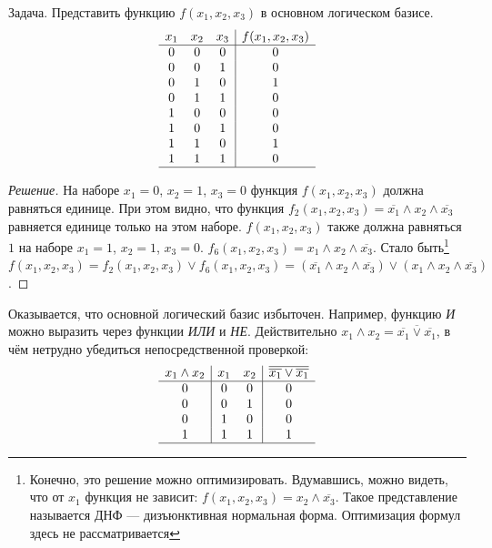 \begin{exampl} Задача. Представить функцию $f(x_1,x_2,x_3)$ в основном логическом базисе.
    \[
        \begin{array}{ccc|c}
            x_1&x_2&x_3&f(x_1,x_2,x_3)\\
            \hline
            0&0&0&0\\
            0&0&1&0\\
            0&1&0&1\\
            0&1&1&0\\
            1&0&0&0\\
            1&0&1&0\\
            1&1&0&1\\
            1&1&1&0\\
            \hline
        \end{array}    
    \]
\end{exampl}
\begin{proof}[Решение]
    На наборе $x_1=0$, $x_2=1$, $x_3=0$ функция $f(x_1,x_2,x_3)$ должна равняться единице. При этом видно, что функция $f_2(x_1,x_2,x_3)=\overline{x_1}\land x_2 \land\overline{x_3}$ равняется единице только на этом наборе. $f(x_1,x_2,x_3)$ также должна равняться $1$ на наборе $x_1=1$, $x_2=1$, $x_3=0$. $f_6(x_1,x_2,x_3)=x_1\land x_2 \land\overline{x_3}$. Стало быть\footnote{Конечно, это решение можно оптимизировать. Вдумавшись, можно видеть, что от $x_1$ функция не зависит: $f(x_1,x_2,x_3)=x_2 \land\overline{x_3}$. Такое представление называется ДНФ --- дизъюнктивная нормальная форма. Оптимизация формул здесь не рассматривается} $f(x_1,x_2,x_3)=f_2(x_1,x_2,x_3)\lor f_6(x_1,x_2,x_3)=(\overline{x_1}\land x_2 \land\overline{x_3})\lor(x_1\land x_2 \land\overline{x_3})$.
\end{proof}

Оказывается, что основной логический базис избыточен. Например, функцию \emph{И} можно выразить через функции \emph{ИЛИ} и \emph{НЕ}. Действительно $x_1\land x_2 = \overline{\overline{x_1}\lor\overline{x_1}}$, в чём нетрудно убедиться непосредственной проверкой:
\[
    \begin{array}{c|cc|c}
        x_1\land x_2&x_1&x_2&\overline{\overline{x_1}\lor\overline{x_1}}\\
        \hline
        0&0&0&0\\
        0&0&1&0\\
        0&1&0&0\\
        1&1&1&1\\
        \hline
    \end{array}
\]

